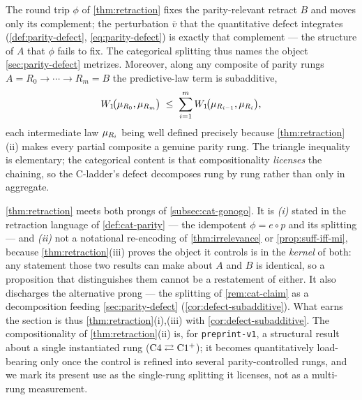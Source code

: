 \begin{corollary}
\label{cor:defect-subadditive}
The round trip $\phi$ of \cref{thm:retraction} fixes the parity-relevant retract
$B$ and moves only its complement; the perturbation $\overline{v}$ that the
quantitative defect integrates (\cref{def:parity-defect},
\eqref{eq:parity-defect}) is exactly that complement --- the structure of $A$
that $\phi$ fails to fix. The categorical splitting thus names the object
\cref{sec:parity-defect} metrizes. Moreover, along any composite of parity rungs
$A=R_0\to\cdots\to R_m=B$ the predictive-law term is subadditive,
\[
  W_{1}\!\big(\mu_{R_0},\mu_{R_m}\big)
  \;\le\;
  \sum_{i=1}^{m}W_{1}\!\big(\mu_{R_{i-1}},\mu_{R_i}\big),
\]
each intermediate law $\mu_{R_i}$ being well defined precisely because
\cref{thm:retraction}(ii) makes every partial composite a genuine parity rung.
The triangle inequality is elementary; the categorical content is that
compositionality \emph{licenses} the chaining, so the C-ladder's defect
decomposes rung by rung rather than only in aggregate.
\end{corollary}

\begin{remark}
\label{rem:cat-go-scope}
\cref{thm:retraction} meets both prongs of \cref{subsec:cat-gonogo}. It is
\emph{(i)} stated in the retraction language of \cref{def:cat-parity} --- the
idempotent $\phi=e\circ p$ and its splitting --- and \emph{(ii)} not a
notational re-encoding of \cref{thm:irrelevance} or \cref{prop:suff-iff-mi},
because \cref{thm:retraction}(iii) proves the object it controls is in the
\emph{kernel} of both: any statement those two results can make about $A$ and
$B$ is identical, so a proposition that distinguishes them cannot be a
restatement of either. It also discharges the alternative prong --- the
splitting of \cref{rem:cat-claim} as a decomposition feeding
\cref{sec:parity-defect} (\cref{cor:defect-subadditive}). What earns the section
is thus \cref{thm:retraction}(i),(iii) with \cref{cor:defect-subadditive}. The
compositionality of \cref{thm:retraction}(ii) is, for \texttt{preprint-v1}, a
structural result about a single instantiated rung
($\mathrm{C}4\rightleftarrows\mathrm{C1^{+}}$); it becomes quantitatively
load-bearing only once the control is refined into several parity-controlled
rungs, and we mark its present use as the single-rung splitting it licenses, not
as a multi-rung measurement.
\end{remark}
